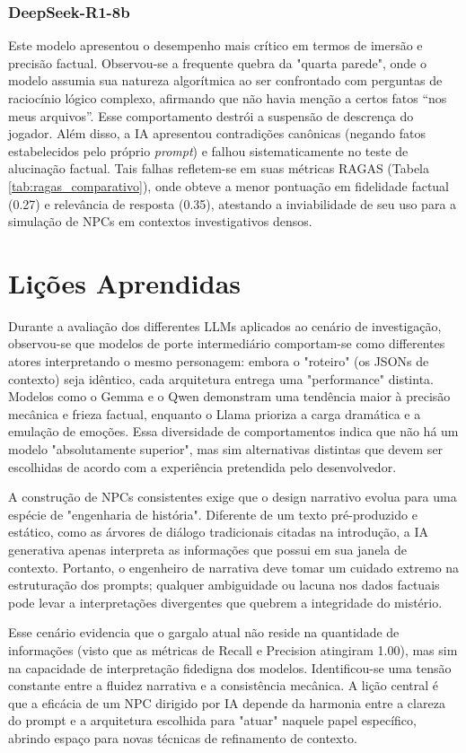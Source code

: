 \documentclass[12pt]{article}
\begin{document}
\subsubsection{DeepSeek-R1-8b}
Este modelo apresentou o desempenho mais crítico em termos de imersão e precisão factual. Observou-se a frequente quebra da "quarta parede", onde o modelo assumia sua natureza algorítmica ao ser confrontado com perguntas de raciocínio lógico complexo, afirmando que não havia menção a certos fatos ``nos meus arquivos''. Esse comportamento destrói a suspensão de descrença do jogador. Além disso, a IA apresentou contradições canônicas (negando fatos estabelecidos pelo próprio \textit{prompt}) e falhou sistematicamente no teste de alucinação factual. Tais falhas refletem-se em suas métricas RAGAS (Tabela \ref{tab:ragas_comparativo}), onde obteve a menor pontuação em fidelidade factual (0.27) e relevância de resposta (0.35), atestando a inviabilidade de seu uso para a simulação de NPCs em contextos investigativos densos.

\section{Lições Aprendidas} 

Durante a avaliação dos differentes LLMs aplicados ao cenário de investigação, observou-se que modelos de porte intermediário comportam-se como differentes atores interpretando o mesmo personagem: embora o "roteiro" (os JSONs de contexto) seja idêntico, cada arquitetura entrega uma "performance" distinta. Modelos como o Gemma e o Qwen demonstram uma tendência maior à precisão mecânica e frieza factual, enquanto o Llama prioriza a carga dramática e a emulação de emoções. Essa diversidade de comportamentos indica que não há um modelo "absolutamente superior", mas sim alternativas distintas que devem ser escolhidas de acordo com a experiência pretendida pelo desenvolvedor.

A construção de NPCs consistentes exige que o design narrativo evolua para uma espécie de "engenharia de história". Diferente de um texto pré-produzido e estático, como as árvores de diálogo tradicionais citadas na introdução, a IA generativa apenas interpreta as informações que possui em sua janela de contexto. Portanto, o engenheiro de narrativa deve tomar um cuidado extremo na estruturação dos prompts; qualquer ambiguidade ou lacuna nos dados factuais pode levar a interpretações divergentes que quebrem a integridade do mistério.

Esse cenário evidencia que o gargalo atual não reside na quantidade de informações (visto que as métricas de Recall e Precision atingiram 1.00), mas sim na capacidade de interpretação fidedigna dos modelos. Identificou-se uma tensão constante entre a fluidez narrativa e a consistência mecânica. A lição central é que a eficácia de um NPC dirigido por IA depende da harmonia entre a clareza do prompt e a arquitetura escolhida para "atuar" naquele papel específico, abrindo espaço para novas técnicas de refinamento de contexto.
\end{document}

